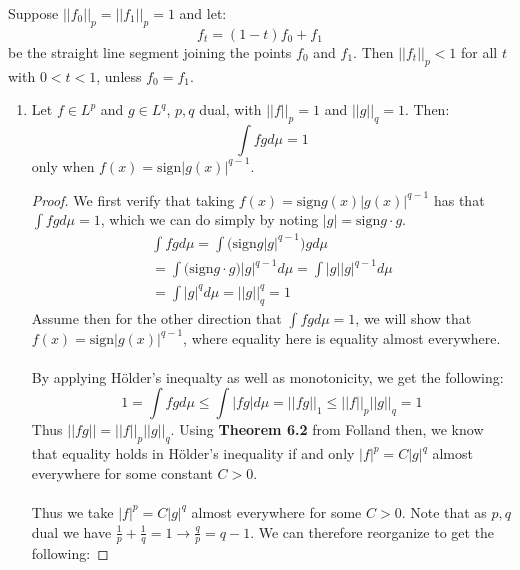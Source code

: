 \documentclass[12pt]{article}
\newenvironment{ex}[2][Exercise]{\begin{trivlist}
\item[\hskip \labelsep {\bfseries #1}\hskip \labelsep {\bfseries #2.}]}{\end{trivlist}}
\begin{document}
\begin{ex}{20}
    Suppose $||f_0||_p = ||f_1||_p = 1$ and let:
    \begin{equation}
        f_t = (1 - t)f_0 + f_1
    \end{equation}
    be the straight line segment joining the points $f_0$ and $f_1$. Then $||f_t||_p < 1$ for all $t$ with $0 < t < 1$, unless $f_0 = f_1$.
    \begin{enumerate}[label=(\alph*)]
        \item Let $f \in L^p$ and $g \in L^q$, $p, q$ dual, with $||f||_p = 1$ and $||g||_q = 1$. Then:
        \begin{equation}
            \int fg d\mu = 1
        \end{equation}
        only when $f(x) = \text{sign}|g(x)|^{q-1}$.
        \begin{proof}
            We first verify that taking $f(x) = \text{sign}g(x)|g(x)|^{q-1}$ has that $\int fg d\mu = 1$, which we can do simply by noting $|g| = \text{sign}g \cdot g$.
            \begin{equation}
                \begin{aligned}
                    \int fg d\mu = \int \Big (\text{sign}g |g|^{q-1} \Big ) g d\mu \\
                    = \int \Big (\text{sign}g \cdot g)|g|^{q-1} d\mu = \int |g||g|^{q-1} d\mu \\
                    = \int |g|^q d\mu = ||g||_q^q = 1
                \end{aligned}
            \end{equation}
            Assume then for the other direction that $\int fg d\mu = 1$, we will show that $f(x) = \text{sign}|g(x)|^{q-1}$, where equality here is equality almost everywhere. \\ \\
            By applying H\"older's inequalty as well as monotonicity, we get the following:
            \begin{equation}
                1 = \int fg d\mu \leq \int |fg| d\mu = ||fg||_1 \leq ||f||_p||g||_q = 1
            \end{equation}
            Thus $||fg|| = ||f||_p||g||_q$. Using \textbf{Theorem 6.2} from Folland then, we know that equality holds in H\"older's inequality if and only $|f|^p = C|g|^q$ almost everywhere for some constant $C > 0$. \\ \\
            Thus we take $|f|^p = C|g|^q$ almost everywhere for some $C > 0$. Note that as $p, q$ dual we have $\frac{1}{p} + \frac{1}{q} = 1 \rightarrow \frac{q}{p} = q - 1$. We can therefore reorganize to get the following:

\end{proof}
\end{enumerate}
\end{ex}
\end{document}
